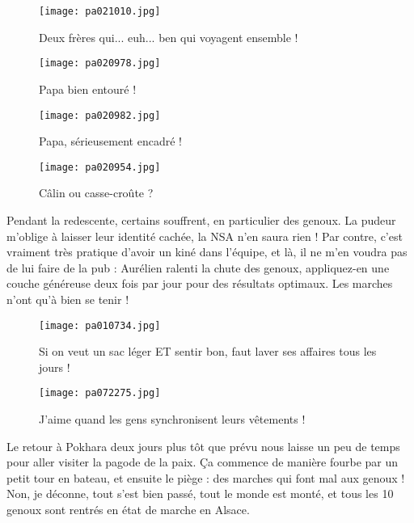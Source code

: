 \documentclass{book}
\begin{document}
\begin{figure}[h]
\centering
\texttt{[image: pa021010.jpg]}
\caption*{Deux frères qui... euh... ben qui voyagent ensemble !}
\end{figure}


\begin{figure}[h]
\centering
\texttt{[image: pa020978.jpg]}
\caption*{Papa bien entouré !}
\end{figure}


\begin{figure}[h]
\centering
\texttt{[image: pa020982.jpg]}
\caption*{Papa, sérieusement encadré !}
\end{figure}


\begin{figure}[h]
\centering
\texttt{[image: pa020954.jpg]}
\caption*{Câlin ou casse-croûte ?}
\end{figure}

Pendant la redescente, certains souffrent, en particulier des genoux. La pudeur m'oblige à laisser leur identité cachée, la NSA n'en saura rien ! Par contre, c'est vraiment très pratique d'avoir un kiné dans l'équipe, et là, il ne m'en voudra pas de lui faire de la pub : Aurélien ralenti la chute des genoux, appliquez-en une couche généreuse deux fois par jour pour des résultats optimaux. Les marches n'ont qu'à bien se tenir !


\begin{figure}[h]
\centering
\texttt{[image: pa010734.jpg]}
\caption*{Si on veut un sac léger ET sentir bon, faut laver ses affaires tous les jours !}
\end{figure}


\begin{figure}[h]
\centering
\texttt{[image: pa072275.jpg]}
\caption*{J'aime quand les gens synchronisent leurs vêtements !}
\end{figure}

Le retour à Pokhara deux jours plus tôt que prévu nous laisse un peu de temps pour aller visiter la pagode de la paix. Ça commence de manière fourbe par un petit tour en bateau, et ensuite le piège : des marches qui font mal aux genoux ! Non, je déconne, tout s'est bien passé, tout le monde est monté, et tous les 10 genoux sont rentrés en état de marche en Alsace.
\end{document}

